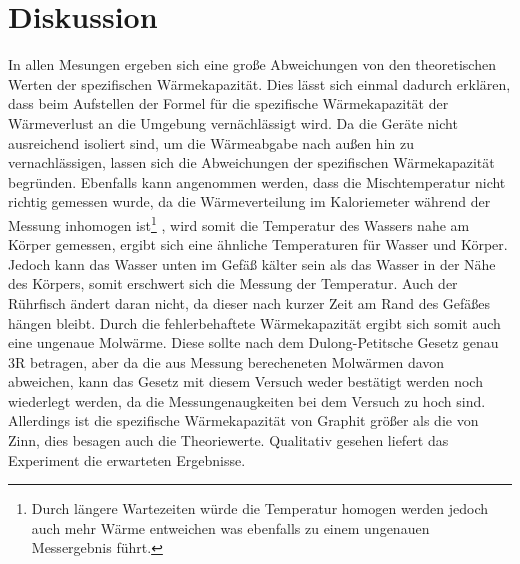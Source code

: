 \newpage
\section{Diskussion}
\label{sec:Diskussion}
In allen Mesungen ergeben sich eine große Abweichungen von den theoretischen Werten der spezifischen Wärmekapazität.
Dies lässt sich einmal dadurch erklären, dass beim Aufstellen der Formel für die spezifische Wärmekapazität der Wärmeverlust an die Umgebung vernächlässigt wird.
Da die Geräte nicht ausreichend isoliert sind, um die Wärmeabgabe nach außen hin zu vernachlässigen, lassen sich die
Abweichungen der spezifischen Wärmekapazität begründen.
Ebenfalls kann angenommen werden, dass die Mischtemperatur nicht richtig gemessen wurde, da
die Wärmeverteilung im Kaloriemeter während der Messung inhomogen ist\footnote{Durch längere Wartezeiten würde die Temperatur homogen werden jedoch
auch mehr Wärme entweichen was ebenfalls zu einem ungenauen Messergebnis führt.} , wird somit die Temperatur des Wassers nahe am
Körper gemessen, ergibt sich eine ähnliche Temperaturen für Wasser und Körper.
Jedoch kann das Wasser unten im Gefäß kälter sein als das Wasser in der Nähe des Körpers, somit erschwert sich die Messung der Temperatur.
Auch der Rührfisch ändert daran nicht, da dieser nach kurzer Zeit am Rand des Gefäßes hängen bleibt.
Durch die fehlerbehaftete Wärmekapazität ergibt sich somit auch eine ungenaue Molwärme.
Diese sollte nach dem Dulong-Petitsche Gesetz genau 3R betragen, aber da die aus Messung
berecheneten Molwärmen davon abweichen, kann das Gesetz mit diesem Versuch weder
bestätigt werden noch  wiederlegt werden, da die Messungenaugkeiten bei dem Versuch zu hoch sind.
Allerdings ist die spezifische Wärmekapazität von Graphit größer als die von Zinn, dies besagen auch die Theoriewerte.
Qualitativ gesehen liefert das Experiment die erwarteten Ergebnisse.
